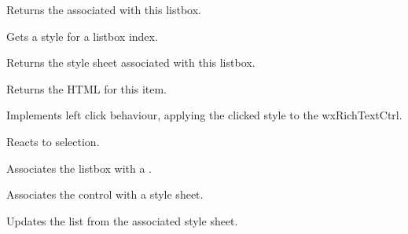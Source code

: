 
Returns the  associated with this listbox.

\label{wxrichtextstylelistboxgetstyle}


Gets a style for a listbox index.

\label{wxrichtextstylelistboxgetstylesheet}


Returns the style sheet associated with this listbox.

\label{wxrichtextstylelistboxongetitem}


Returns the HTML for this item.

\label{wxrichtextstylelistboxonleftdown}


Implements left click behaviour, applying the clicked style to the wxRichTextCtrl.

\label{wxrichtextstylelistboxonselect}


Reacts to selection.

\label{wxrichtextstylelistboxsetrichtextctrl}


Associates the listbox with a .

\label{wxrichtextstylelistboxsetstylesheet}


Associates the control with a style sheet.

\label{wxrichtextstylelistboxupdatestyles}


Updates the list from the associated style sheet.
